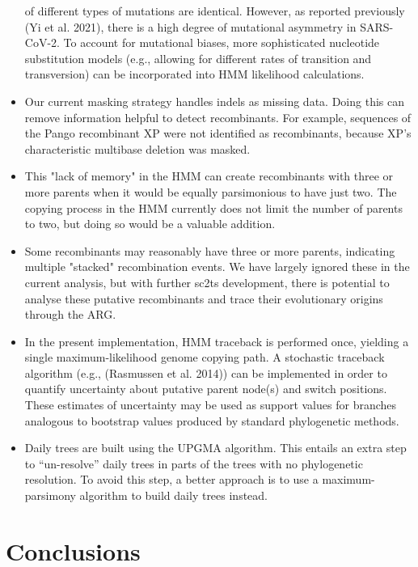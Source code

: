 \documentclass{article}
\begin{document}
\begin{itemize}
of different types of mutations are identical. However, as reported previously
(Yi et al. 2021), there is a high degree of mutational asymmetry in SARS-CoV-2.
To account for mutational biases, more sophisticated nucleotide substitution
models (e.g., allowing for different rates of transition and transversion) can
be incorporated into HMM likelihood calculations. \item Our current masking
strategy handles indels as missing data. Doing this can remove information
helpful to detect recombinants. For example, sequences of the Pango recombinant
XP were not identified as recombinants, because XP’s characteristic multibase
deletion was masked. \item This "lack of memory" in the HMM can create
recombinants with three or more parents when it would be equally parsimonious
to have just two. The copying process in the HMM currently does not limit the
number of parents to two, but doing so would be a valuable addition. \item Some
recombinants may reasonably have three or more parents, indicating multiple
"stacked" recombination events. We have largely ignored these in the current
analysis, but with further sc2ts development, there is potential to analyse
these putative recombinants and trace their evolutionary origins through the
ARG. \item In the present implementation, HMM traceback is performed once,
yielding a single maximum-likelihood genome copying path. A stochastic
traceback algorithm (e.g., (Rasmussen et al. 2014)) can be implemented in order
to quantify uncertainty about putative parent node(s) and switch positions.
These estimates of uncertainty may be used as support values for branches
analogous to bootstrap values produced by standard phylogenetic methods. \item
Daily trees are built using the UPGMA algorithm. This entails an extra step to
“un-resolve” daily trees in parts of the trees with no phylogenetic resolution.
To avoid this step, a better approach is to use a maximum-parsimony algorithm
to build daily trees instead. \end{itemize}

\section{Conclusions}
\end{document}
